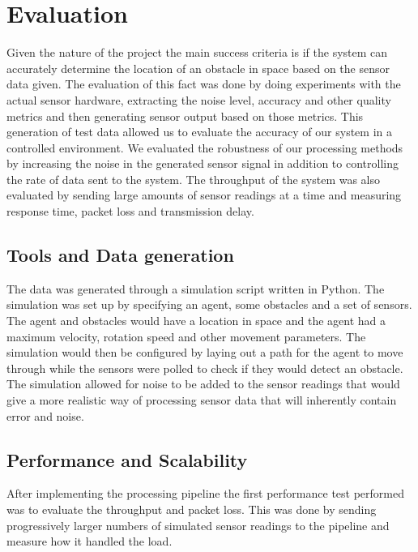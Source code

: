 \documentclass[prodmode,acmtosem]{acmsmall} %
\begin{document}


\section{Evaluation}
Given the nature of the project the main success criteria is if the system can accurately determine the location of an obstacle in space based on the sensor data given. The evaluation of this fact was done by doing experiments with the actual sensor hardware, extracting the noise level, accuracy and other quality metrics and then generating sensor output based on those metrics. This generation of test data allowed us to evaluate the accuracy of our system in a controlled environment. We evaluated the robustness of our processing methods by increasing the noise in the generated sensor signal in addition to controlling the rate of data sent to the system. The throughput of the system was also evaluated by sending large amounts of sensor readings at a time and measuring response time, packet loss and transmission delay.


\subsection{Tools and Data generation}
The data was generated through a simulation script written in Python. The simulation was set up by specifying an agent, some obstacles and a set of sensors. The agent and obstacles would have a location in space and the agent had a maximum velocity, rotation speed and other movement parameters. The simulation would then be configured by laying out a path for the agent to move through while the sensors were polled to check if they would detect an obstacle. The simulation allowed for noise to be added to the sensor readings that would give a more realistic way of processing sensor data that will inherently contain error and noise.

\subsection{Performance and Scalability}
After implementing the processing pipeline the first performance test performed was to evaluate the throughput and packet loss. This was done by sending progressively larger numbers of simulated sensor readings to the pipeline and measure how it handled the load.
\end{document}
